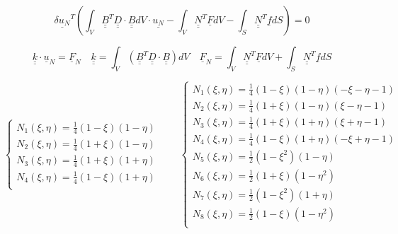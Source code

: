 \documentclass[a4paper]{jpconf}
\begin{document}
\begin{equation}
\underline{\delta u_{N}}^{T}\left(\int_{V}\underline{\underline{B}}^{T}\underline{\underline{D}}\cdot\underline{\underline{B}}dV\cdot\underline{u_{N}}-\int_{V}\underline{\underline{N}}^{T}\underline{F}dV-\int_{S}\underline{\underline{N}}^{T}\underline{f}dS\right)=0
\end{equation}

\begin{equation}
\underline{\underline{k}}\cdot\underline{u}_{N}=\underline{F}_{N}\quad\underline{\underline{k}}=\int_{V}\left(\underline{\underline{B}}^{T}\underline{\underline{D}}\cdot\underline{\underline{B}}\right)dV\quad\underline{F}_{N}=\int_{V}\underline{\underline{N}}^{T}\underline{F}dV+\int_{S}\underline{\underline{N}}^{T}\underline{f}dS
\end{equation}

\begin{equation}
\begin{cases}
N_{1}\left(\xi,\eta\right)=\frac{1}{4}\left(1-\xi\right)\left(1-\eta\right)\\
N_{2}\left(\xi,\eta\right)=\frac{1}{4}\left(1+\xi\right)\left(1-\eta\right)\\
N_{3}\left(\xi,\eta\right)=\frac{1}{4}\left(1+\xi\right)\left(1+\eta\right)\\
N_{4}\left(\xi,\eta\right)=\frac{1}{4}\left(1-\xi\right)\left(1+\eta\right)\\
\end{cases}\qquad\begin{cases}
N_{1}\left(\xi,\eta\right)=\frac{1}{4}\left(1-\xi\right)\left(1-\eta\right)\left(-\xi-\eta-1\right)\\
N_{2}\left(\xi,\eta\right)=\frac{1}{4}\left(1+\xi\right)\left(1-\eta\right)\left(\xi-\eta-1\right)\\
N_{3}\left(\xi,\eta\right)=\frac{1}{4}\left(1+\xi\right)\left(1+\eta\right)\left(\xi+\eta-1\right)\\
N_{4}\left(\xi,\eta\right)=\frac{1}{4}\left(1-\xi\right)\left(1+\eta\right)\left(-\xi+\eta-1\right)\\
N_{5}\left(\xi,\eta\right)=\frac{1}{2}\left(1-\xi^{2}\right)\left(1-\eta\right)\\
N_{6}\left(\xi,\eta\right)=\frac{1}{2}\left(1+\xi\right)\left(1-\eta^{2}\right)\\
N_{7}\left(\xi,\eta\right)=\frac{1}{2}\left(1-\xi^{2}\right)\left(1+\eta\right)\\
N_{8}\left(\xi,\eta\right)=\frac{1}{2}\left(1-\xi\right)\left(1-\eta^{2}\right)\\
\end{cases}
\end{equation}
\end{document}
